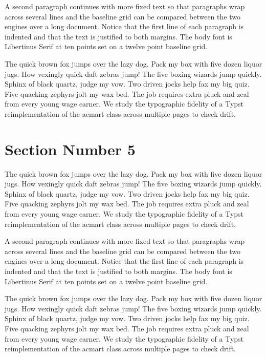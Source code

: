 \documentclass[acmsmall,nonacm]{acmart}
\begin{document}
A second paragraph continues with more fixed text so that paragraphs wrap across several lines and the baseline grid can be compared between the two engines over a long document. Notice that the first line of each paragraph is indented and that the text is justified to both margins. The body font is Libertinus Serif at ten points set on a twelve point baseline grid.

The quick brown fox jumps over the lazy dog. Pack my box with five dozen liquor jugs. How vexingly quick daft zebras jump! The five boxing wizards jump quickly. Sphinx of black quartz, judge my vow. Two driven jocks help fax my big quiz. Five quacking zephyrs jolt my wax bed. The job requires extra pluck and zeal from every young wage earner. We study the typographic fidelity of a Typst reimplementation of the acmart class across multiple pages to check drift.

\section{Section Number 5}
The quick brown fox jumps over the lazy dog. Pack my box with five dozen liquor jugs. How vexingly quick daft zebras jump! The five boxing wizards jump quickly. Sphinx of black quartz, judge my vow. Two driven jocks help fax my big quiz. Five quacking zephyrs jolt my wax bed. The job requires extra pluck and zeal from every young wage earner. We study the typographic fidelity of a Typst reimplementation of the acmart class across multiple pages to check drift.

A second paragraph continues with more fixed text so that paragraphs wrap across several lines and the baseline grid can be compared between the two engines over a long document. Notice that the first line of each paragraph is indented and that the text is justified to both margins. The body font is Libertinus Serif at ten points set on a twelve point baseline grid.

The quick brown fox jumps over the lazy dog. Pack my box with five dozen liquor jugs. How vexingly quick daft zebras jump! The five boxing wizards jump quickly. Sphinx of black quartz, judge my vow. Two driven jocks help fax my big quiz. Five quacking zephyrs jolt my wax bed. The job requires extra pluck and zeal from every young wage earner. We study the typographic fidelity of a Typst reimplementation of the acmart class across multiple pages to check drift.
\end{document}
